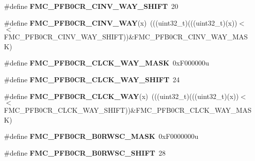 \begin{DoxyCompactItemize}
\item 
\#define {\bfseries F\+M\+C\+\_\+\+P\+F\+B0\+C\+R\+\_\+\+C\+I\+N\+V\+\_\+\+W\+A\+Y\+\_\+\+S\+H\+I\+FT}~20\hypertarget{group__FMC__Register__Masks_ga987dfe8d13ee805246f048943fcb9ee5}{}\label{group__FMC__Register__Masks_ga987dfe8d13ee805246f048943fcb9ee5}

\item 
\#define {\bfseries F\+M\+C\+\_\+\+P\+F\+B0\+C\+R\+\_\+\+C\+I\+N\+V\+\_\+\+W\+AY}(x)~(((uint32\+\_\+t)(((uint32\+\_\+t)(x))$<$$<$F\+M\+C\+\_\+\+P\+F\+B0\+C\+R\+\_\+\+C\+I\+N\+V\+\_\+\+W\+A\+Y\+\_\+\+S\+H\+I\+FT))\&F\+M\+C\+\_\+\+P\+F\+B0\+C\+R\+\_\+\+C\+I\+N\+V\+\_\+\+W\+A\+Y\+\_\+\+M\+A\+SK)\hypertarget{group__FMC__Register__Masks_ga7479958e36ef48e44a9342dde2f075df}{}\label{group__FMC__Register__Masks_ga7479958e36ef48e44a9342dde2f075df}

\item 
\#define {\bfseries F\+M\+C\+\_\+\+P\+F\+B0\+C\+R\+\_\+\+C\+L\+C\+K\+\_\+\+W\+A\+Y\+\_\+\+M\+A\+SK}~0x\+F000000u\hypertarget{group__FMC__Register__Masks_ga84cd7c7d92e93b07f7c0f8d7cf003b98}{}\label{group__FMC__Register__Masks_ga84cd7c7d92e93b07f7c0f8d7cf003b98}

\item 
\#define {\bfseries F\+M\+C\+\_\+\+P\+F\+B0\+C\+R\+\_\+\+C\+L\+C\+K\+\_\+\+W\+A\+Y\+\_\+\+S\+H\+I\+FT}~24\hypertarget{group__FMC__Register__Masks_ga3629d923b58bcbe6202254d72c69fab9}{}\label{group__FMC__Register__Masks_ga3629d923b58bcbe6202254d72c69fab9}

\item 
\#define {\bfseries F\+M\+C\+\_\+\+P\+F\+B0\+C\+R\+\_\+\+C\+L\+C\+K\+\_\+\+W\+AY}(x)~(((uint32\+\_\+t)(((uint32\+\_\+t)(x))$<$$<$F\+M\+C\+\_\+\+P\+F\+B0\+C\+R\+\_\+\+C\+L\+C\+K\+\_\+\+W\+A\+Y\+\_\+\+S\+H\+I\+FT))\&F\+M\+C\+\_\+\+P\+F\+B0\+C\+R\+\_\+\+C\+L\+C\+K\+\_\+\+W\+A\+Y\+\_\+\+M\+A\+SK)\hypertarget{group__FMC__Register__Masks_ga891aff14fe52073658bd2479dffb4681}{}\label{group__FMC__Register__Masks_ga891aff14fe52073658bd2479dffb4681}

\item 
\#define {\bfseries F\+M\+C\+\_\+\+P\+F\+B0\+C\+R\+\_\+\+B0\+R\+W\+S\+C\+\_\+\+M\+A\+SK}~0x\+F0000000u\hypertarget{group__FMC__Register__Masks_ga6231856131c9747d8bf0b2bebcf4f172}{}\label{group__FMC__Register__Masks_ga6231856131c9747d8bf0b2bebcf4f172}

\item 
\#define {\bfseries F\+M\+C\+\_\+\+P\+F\+B0\+C\+R\+\_\+\+B0\+R\+W\+S\+C\+\_\+\+S\+H\+I\+FT}~28\hypertarget{group__FMC__Register__Masks_gafc34ff86025a1657d05d3f6a2de1ec7f}{}\label{group__FMC__Register__Masks_gafc34ff86025a1657d05d3f6a2de1ec7f}


\end{DoxyCompactItemize}
